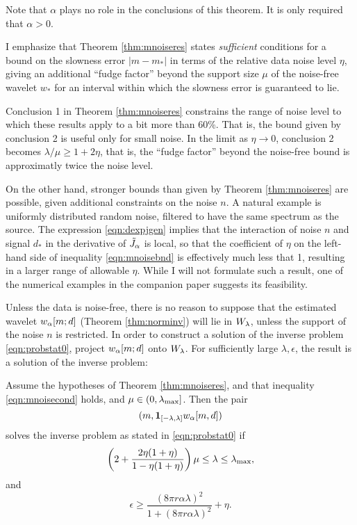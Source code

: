  Note that $\alpha$ plays no role in the
conclusions of this theorem. It is only required that $\alpha >0$.

 I emphasize that Theorem \ref{thm:mnoiseres} states {\em sufficient} conditions for a bound on
the slowness error $|m-m_*|$ in terms of the relative data noise level $\eta$,
giving an additional ``fudge factor'' beyond the support size $\mu$
of the noise-free wavelet $w_*$ for an interval within which the slowness error is
guaranteed to lie.

Conclusion 1 in Theorem \ref{thm:mnoiseres} constrains the range of
noise level to which these results apply to a bit more than 60\%. That
is, the bound given by conclusion 2 is useful only for small noise. In
the limit as $\eta \rightarrow 0$, conclusion 2 becomes
$\lambda/\mu \ge 1 + 2\eta$, that is, the ``fudge factor'' beyond
the noise-free bound is approximatly twice the noise level.

On the other hand, stronger bounds than given by Theorem
\ref{thm:mnoiseres} are possible, given additional constraints on the
noise $n$. A natural example is uniformly distributed random noise,
filtered to have the same spectrum as the source. The expression
\ref{eqn:dexpjgen} implies that the interaction of noise $n$ and
signal $d_*$ in the derivative of $\tilde{J}_{\alpha}$ is local, so that the
coefficient of $\eta$ on the left-hand side of inequality
\ref{eqn:mnoisebnd} is effectively much less that 1, resulting in a
larger range of allowable $\eta$. While I will not formulate such a
result, one of the numerical examples in the companion paper
\cite[]{SymesChenMinkoff:21} suggests its feasibility.

Unless the data is noise-free, there is no reason to suppose that the
estimated wavelet $w_{\alpha}[m;d]$ (Theorem \ref{thm:norminv}) will lie in
$W_{\lambda}$, unless the support of the noise $n$ is restricted. In order
to construct a solution of the inverse problem \ref{eqn:probstat0}, 
project $w_{\alpha}[m;d]$ onto $W_{\lambda}$. For sufficiently large $\lambda,
\epsilon$, the result is a solution of the inverse problem:

\begin{theorem}
  \label{thm:ipnoisesuf}
  Assume the hypotheses of Theorem \ref{thm:mnoiseres}, and that
  inequality \ref{eqn:mnoisecond} holds, and $\mu \in
  (0,\lambda_{\rm max}]$. Then the pair
  \[
    (m,{\bf 1}_{[-\lambda,\lambda]}w_{\alpha}[m,d])
  \]
  solves the inverse problem as stated in \ref{eqn:probstat0} if
  \begin{equation}
    \label{eqn:ipnoiselam}
    \left( 2+\frac{2\eta(1+\eta)}{1-\eta(1+\eta)}\right)\mu \le \lambda
    \le \lambda_{\rm max}, 
  \end{equation}
  and
  \begin{equation}
    \label{eqn:ipnoiseeps}
    \epsilon \ge \frac{(8 \pi r \alpha\lambda)^2}{1 + (8 \pi r \alpha\lambda)^2}+\eta. 
  \end{equation}    
\end{theorem}

